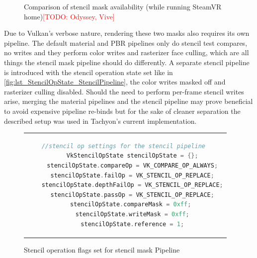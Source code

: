 \begin{figure}[h]
  \centering
  \hspace*{\fill}
  \hfill
  \hspace*{\fill}
     \caption{Comparison of stencil mask availability (while running SteamVR home)\textcolor{red}{[TODO: Odyssey, Vive]}}
     \label{fig:empty_mask}
\end{figure}

Due to Vulkan's verbose nature, rendering these two masks also requires its own pipeline. The default material and PBR pipelines only do stencil test compares, no writes and they perform color writes and rasterizer face culling, which are all things the stencil mask pipeline should do differently. A separate stencil pipeline is introduced with the stencil operation state set like in \autoref{fig:lst_StencilOpState_StencilPipeline}, the color writes masked off and rasterizer culling disabled. Should the need to perform per-frame stencil writes arise, merging the material pipelines and the stencil pipeline may prove beneficial to avoid expensive pipeline re-binds but for the sake of cleaner separation the described setup was used in \gls{Tachyon}'s current implementation. 

\begin{figure}[htb]
  \centering
  \begin{tabular}{c}
  \begin{lstlisting}[language=C++]
	//stencil op settings for the stencil pipeline 
	VkStencilOpState stencilOpState = {};
	stencilOpState.compareOp = VK_COMPARE_OP_ALWAYS;
	stencilOpState.failOp = VK_STENCIL_OP_REPLACE;
	stencilOpState.depthFailOp = VK_STENCIL_OP_REPLACE;
	stencilOpState.passOp = VK_STENCIL_OP_REPLACE;
	stencilOpState.compareMask = 0xff; 
	stencilOpState.writeMask = 0xff;
	stencilOpState.reference = 1;
	\end{lstlisting}
  \end{tabular}
  \caption[Stencil pipeline stencil operation flags]{Stencil operation flags set for stencil mask Pipeline}\label{fig:lst_StencilOpState_StencilPipeline}
\end{figure}
